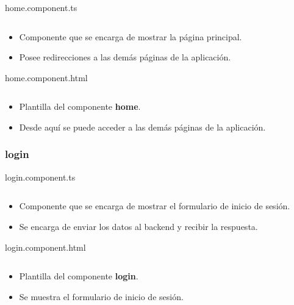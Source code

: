 \documentclass{article}
\newenvironment{block}{\captionsetup{type=listing}}{}
\begin{document}
\begin{block}
	\caption{home.component.ts}
	\inputminted{TypeScript}{kioskios_web/src/app/home/home.component.ts}
	\begin{itemize}
		\item Componente que se encarga de mostrar la página principal.
		\item Posee redirecciones a las demás páginas de la aplicación.
	\end{itemize}

	\caption{home.component.html}
	\inputminted{HTML}{kioskios_web/src/app/home/home.component.html}
	\begin{itemize}
		\item Plantilla del componente \textbf{home}.
		\item Desde aquí se puede acceder a las demás páginas de la aplicación.
	\end{itemize}
\end{block}

\subsubsection{login}
\begin{block}
	\caption{login.component.ts}
	\inputminted{TypeScript}{kioskios_web/src/app/login/login.component.ts}
	\begin{itemize}
		\item Componente que se encarga de mostrar el formulario de inicio de sesión.
		\item Se encarga de enviar los datos al backend y recibir la respuesta.
	\end{itemize}

	\caption{login.component.html}
	\inputminted{HTML}{kioskios_web/src/app/login/login.component.html}
	\begin{itemize}
		\item Plantilla del componente \textbf{login}.
		\item Se muestra el formulario de inicio de sesión.
	\end{itemize}
\end{block}
\end{document}
